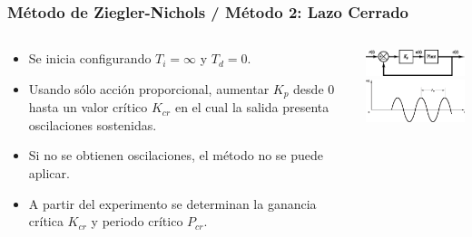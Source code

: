 \documentclass[aspectratio=169]{beamer}
\theoremstyle{definition}
\theoremstyle{plain}
\theoremstyle{remark}
\begin{document}
\begin{frame}[<+->]\frametitle{Método de Ziegler-Nichols / Método 2: Lazo Cerrado}
\begin{columns}
\begin{column}{0.5\textwidth}
	\begin{itemize}
		\item Se inicia configurando $T_i = \infty$ y $T_d = 0$.
		\item Usando sólo acción proporcional, aumentar $K_p$ desde 0 hasta un valor crítico $K_{cr}$ en el cual la salida presenta oscilaciones sostenidas.
		\item Si no se obtienen oscilaciones, el método no se puede aplicar.
		\item A partir del experimento se determinan la ganancia crítica $K_{cr}$ y periodo crítico $P_{cr}$.
	\end{itemize}	
\end{column}	
\begin{column}{0.5\textwidth}
	\includegraphics[width=6.5cm]{images/zieglerNichols2a.eps}\\
	\vspace*{5mm}
	\includegraphics[width=6.5cm]{images/zieglerNichols2b.eps}
\end{column}	
\end{columns}
\end{frame}
\small
\end{document}

